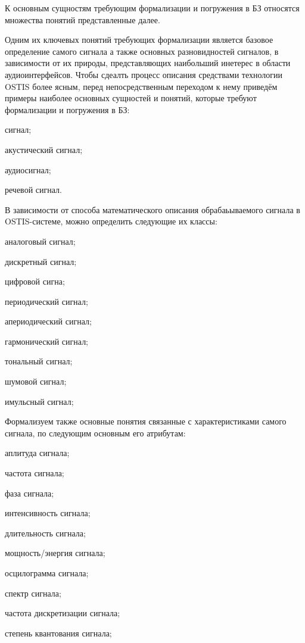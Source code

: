 К основным сущностям требующим формализации и погружения в БЗ относятся множества понятий представленные далее. 

Одним их ключевых понятий требующих формализации является базовое определение самого сигнала а также основных разновидностей сигналов, в зависимости от их природы, представляющих наибольший инетерес в области аудиоинтерфейсов. Чтобы сдеалть процесс описания средствами технологии OSTIS более ясным, перед непосредственным переходом к нему приведём примеры наиболее  основных сущностей и понятий, которые требуют формализации и погружения в БЗ:

\begin{textitemize}    
    \item сигнал;
    \item акустический сигнал;
    \item аудиосигнал;
    \item речевой сигнал.
\end{textitemize}

В зависимости от способа математического описания обрабаьываемого сигнала в  OSTIS-системе, можно определить следующие их классы:

\begin{textitemize}    
    \item аналоговый сигнал;
    \item дискретный сигнал;
    \item цифровой сигна;
    \item периодический сигнал;
    \item апериодический сигнал;
    \item гармонический сигнал;
    \item тональный сигнал;
    \item шумовой сигнал;
    \item имульсный сигнал;
\end{textitemize}

Формализуем также основные понятия связанные с характеристиками самого сигнала, по следующим основным его атрибутам:
\begin{textitemize}  
    \item аплитуда сигнала;
    \item частота сигнала;
    \item фаза сигнала;
    \item интенсивность сигнала;
    \item длительность сигнала;
    \item мощность/энергия сигнала;
    \item осцилограмма сигнала;
    \item спектр сигнала;
    \item частота дискретизации сигнала;
    \item степень квантования сигнала;
\end{textitemize}

